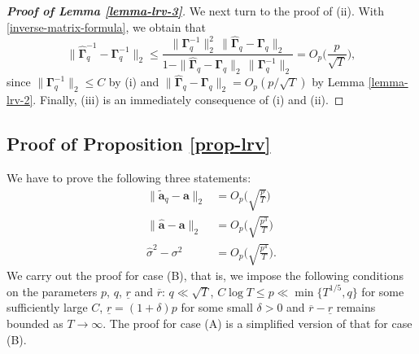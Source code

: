 \begin{proof}[\textnormal{\textbf{Proof of Lemma \ref{lemma-lrv-3}}}]
We next turn to the proof of (ii). With \eqref{inverse-matrix-formula}, we obtain that 
\[ \| \widehat{\boldsymbol{\Gamma}}_q^{-1} - \boldsymbol{\Gamma}_q^{-1} \|_2 \le \frac{ \| \boldsymbol{\Gamma}_q^{-1} \|_2^2 \, \| \widehat{\boldsymbol{\Gamma}}_q - \boldsymbol{\Gamma}_q \|_2 }{1  -  \| \widehat{\boldsymbol{\Gamma}}_q - \boldsymbol{\Gamma}_q \|_2 \, \| \boldsymbol{\Gamma}_q^{-1} \|_2} = O_p\Big( \frac{p}{\sqrt{T}} \Big), \]
since  $\| \boldsymbol{\Gamma}_q^{-1} \|_2 \le C$ by (i) and $\| \widehat{\boldsymbol{\Gamma}}_q - \boldsymbol{\Gamma}_q \|_2 = O_p(p/\sqrt{T})$ by Lemma \ref{lemma-lrv-2}. Finally, (iii) is an immediately consequence of (i) and (ii). 
\end{proof}



\subsection*{Proof of Proposition \ref{prop-lrv}}


We have to prove the following three statements: 
\begin{align}
\| \widetilde{\boldsymbol{a}}_q - \boldsymbol{a} \|_2 & = O_p\Big( \sqrt{\frac{p}{T}} \Big) \label{prop-lrv-statement1} \\ 
\| \widehat{\boldsymbol{a}} - \boldsymbol{a} \|_2 & = O_p\Big( \sqrt{\frac{p^3}{T}} \Big) \label{prop-lrv-statement2} \\
\widehat{\sigma}^2 - \sigma^2 & = O_p\Big( \sqrt{\frac{p^4}{T}} \Big). \label{prop-lrv-statement3}
\end{align} 
We carry out the proof for case (B), that is, we impose the following conditions on the parameters $p$, $q$, $\underline{r}$ and $\overline{r}$: $q \ll \sqrt{T}$, $C \log T \le p \ll \min\{ T^{1/5},q\}$ for some sufficiently large $C$, $\underline{r} = (1+\delta)p$ for some small $\delta > 0$ and $\overline{r} - \underline{r}$ remains bounded as $T \rightarrow \infty$. The proof for case (A) is a simplified version of that for case (B). 


